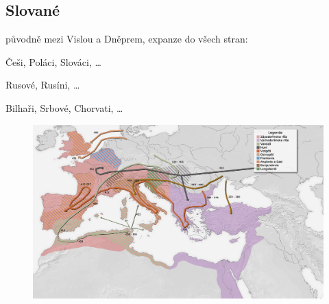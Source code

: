 \documentclass{article}
\begin{document}
\vspace{-2em}
\subsection*{Slované}
    původně mezi Vislou a Dněprem, expanze do všech stran:
    \begin{description}
        \setlength\itemsep{0.15em}
        \item[západní:] Češi, Poláci, Slováci, \dots
        \item[východní:] Rusové, Rusíni, \dots
        \item[jižní:] Bilhaři, Srbové, Chorvati, \dots
    \end{description}

\begin{figure}[h]
    \includegraphics[width=\linewidth]{mapa-celk.png}
\end{figure}
\end{document}
